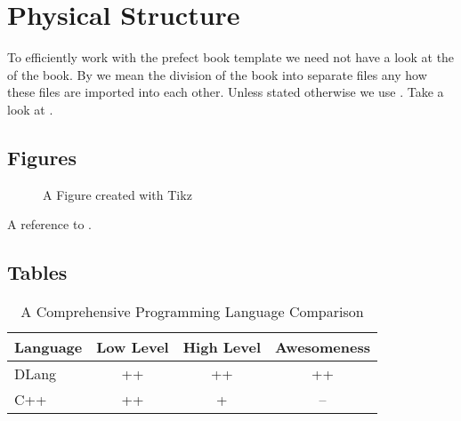 \documentclass[crop=false,class=scrbook]{standalone}
\begin{document}
\chapter{Physical Structure}
To efficiently work with the prefect book template we need not have a look at
the  of the book.
By  we mean the division of the book into separate files any how these
files are imported into each other.
Unless stated otherwise we use .
Take a look at .

\cleardoublepage
\section{Figures}
\begin{figure}[h]
	
	\caption{A Figure created with Tikz}
	\label{fig:figure1}
\end{figure}

A reference to .

\section{Tables}
\begin{table}[h]
\begin{tabular}{l | c c c}
Language & Low Level & High Level & Awesomeness \\ \hline
DLang & ++ & ++ & ++ \\
C++ & ++ & + & --
\end{tabular}
\caption{A Comprehensive Programming Language Comparison}
\label{tab:programminglanguagecmp}
\end{table}
\end{document}
